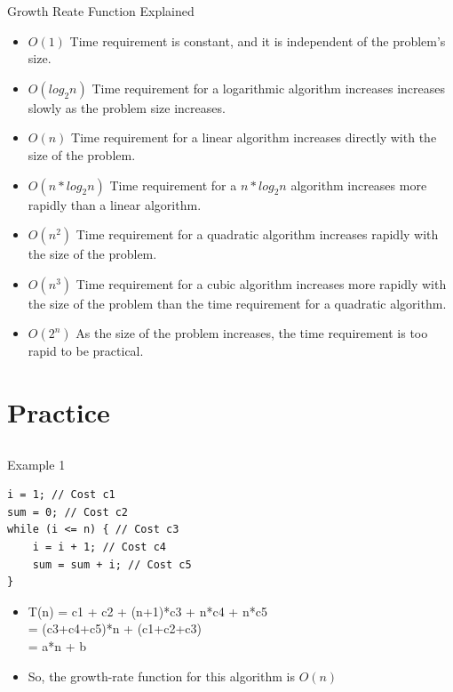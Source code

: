 \documentclass{beamer}
\begin{document}
\begin{frame}{Growth Reate Function Explained}
\begin{itemize}
\item $O(1)$             Time requirement is constant, and it is independent of the problem's size.
\item $O(log_2n)$      Time requirement for a logarithmic algorithm increases increases slowly
                 as the problem size increases.
\item $O(n)$      Time requirement for a linear algorithm increases directly with the size
                 of the problem.
\item $O(n*log_2n)$ Time requirement for a $n*log_2n$ algorithm increases more rapidly than
                 a linear algorithm.
\item $O(n^2)$       Time requirement for a quadratic algorithm increases rapidly with the
                 size of the problem.
\item $O(n^3)$       Time requirement for a cubic algorithm increases more rapidly with the
                 size of the problem than the time requirement for a quadratic algorithm.
\item $O(2^n)$      As the size of the problem increases, the time requirement is too rapid to be practical.
\end{itemize}
\end{frame}

\section{Practice}
\subsection{}
\begin{frame}[fragile]{Example 1}
\begin{lstlisting}
i = 1; // Cost c1
sum = 0; // Cost c2
while (i <= n) { // Cost c3
    i = i + 1; // Cost c4
    sum = sum + i; // Cost c5
} 
\end{lstlisting}
\begin{itemize}
\item <2-> T(n)  =  c1 + c2 + (n+1)*c3 + n*c4 + n*c5 \\
            = (c3+c4+c5)*n + (c1+c2+c3) \\
            = a*n + b
\item <2-> So, the growth-rate function for this algorithm is $O(n)$
\end{itemize}
\end{frame}
\end{document}
